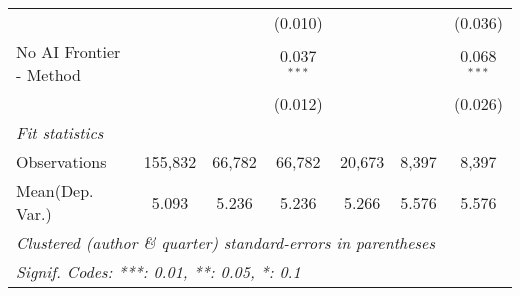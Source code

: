 \begin{tabular}{lcccccc}
                           &               &               & (0.010)       &               &               & (0.036)\\   
   No AI Frontier - Method &               &               & 0.037$^{***}$ &               &               & 0.068$^{***}$\\   
                           &               &               & (0.012)       &               &               & (0.026)\\   
   \midrule
   \emph{Fit statistics}\\
   Observations            & 155,832       & 66,782        & 66,782        & 20,673        & 8,397         & 8,397\\  
Mean(Dep. Var.) & 5.093 & 5.236 & 5.236 & 5.266 & 5.576 & 5.576 \\
   \midrule \midrule
   \multicolumn{7}{l}{\emph{Clustered (author \& quarter) standard-errors in parentheses}}\\
   \multicolumn{7}{l}{\emph{Signif. Codes: ***: 0.01, **: 0.05, *: 0.1}}\\
\end{tabular}
\par\endgroup
